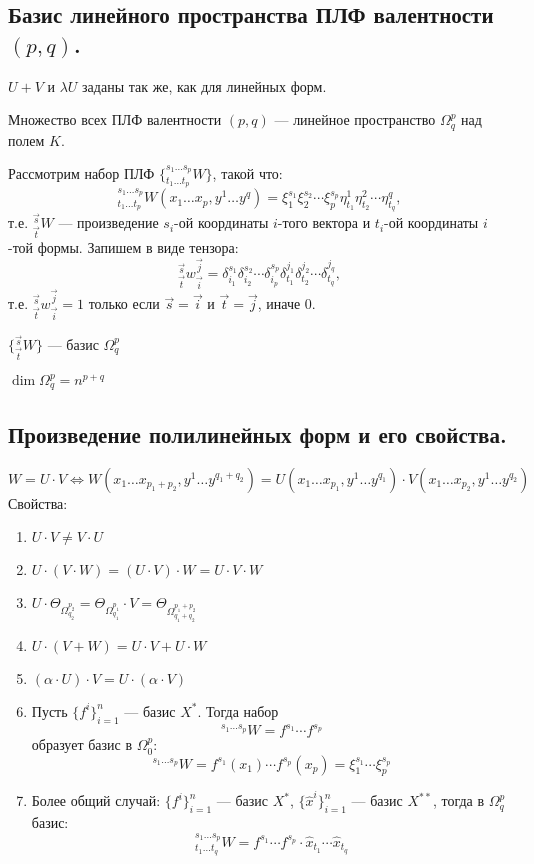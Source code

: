 \subsection{Базис линейного пространства ПЛФ валентности $(p,q)$.}
\begin{definition}
    $U+V$ и $\lambda U$ заданы так же, как для линейных форм.
\end{definition}
\begin{theorem}
    Множество всех ПЛФ валентности $(p, q)$ --- линейное пространство $\Omega^p_q$ над полем $K$.
\end{theorem}
Рассмотрим набор ПЛФ $\{{}^{s_1\ldots s_p}_{t_1\ldots t_p}W\}$, такой что:
$${}^{s_1\ldots s_p}_{t_1\ldots t_p}W(x_1\ldots x_p,y^1\ldots y^q)=\xi_1^{s_1}\xi_2^{s_2}\cdots \xi_p^{s_p}\eta^1_{t_1}\eta^2_{t_2}\cdots \eta^q_{t_q},$$
т.е. ${}^{\vec s}_{\vec t} W$ --- произведение $s_i$-ой координаты $i$-того вектора и $t_i$-ой координаты $i$-той формы. Запишем в виде тензора:
$${}^{\vec s}_{\vec t} w^{\vec j}_{\vec i}=\delta_{i_1}^{s_1}\delta_{i_2}^{s_2}\cdots \delta_{i_p}^{s_p}\delta_{t_1}^{j_1}\delta_{t_2}^{j_2}\cdots\delta_{t_q}^{j_q},$$
т.е. ${}^{\vec s}_{\vec t} w^{\vec j}_{\vec i}=1$ только если $\vec s=\vec i$ и $\vec t=\vec j$, иначе $0$.
\begin{theorem}
    $\{{}^{\vec s}_{\vec t} W\}$ --- базис $\Omega^p_q$
\end{theorem}
$\dim\Omega^p_q=n^{p+q}$
\subsection{Произведение полилинейных форм и его свойства.}
$$W=U\cdot V\Leftrightarrow W(x_1\ldots x_{p_1+p_2}, y^1\ldots y^{q_1+q_2})=U(x_1\ldots x_{p_1}, y^1\ldots y^{q_1})\cdot V(x_1\ldots x_{p_2}, y^1\ldots y^{q_2})$$
Свойства:
\begin{enumerate}
    \item $U\cdot V\not=V\cdot U$
    \item $U\cdot(V\cdot W)=(U\cdot V)\cdot W=U\cdot V\cdot W$
    \item $U\cdot \Theta_{\Omega^{p_2}_{q_2}}=\Theta_{\Omega^{p_1}_{q_1}}\cdot V=\Theta_{\Omega^{p_1+p_2}_{q_1+q_2}}$
    \item $U\cdot(V+W)=U\cdot V+U\cdot W$
    \item $(\alpha\cdot U)\cdot V=U\cdot (\alpha\cdot V)$
    \item Пусть $\{f^i\}_{i=1}^n$ --- базис $X^*$. Тогда набор
    $${}^{s_1\ldots s_p}W=f^{s_1}\cdots f^{s_p}$$
    образует базис в $\Omega^p_0$:
    $${}^{s_1\ldots s_p}W=f^{s_1}(x_1)\cdots f^{s_p}(x_p)=\xi^{s_1}_1\cdots \xi^{s_p}_p$$
    \item Более общий случай: $\{f^i\}_{i=1}^n$ --- базис $X^*$, $\{\hat x^i\}_{i=1}^n$ --- базис $X^{**}$, тогда в $\Omega^p_q$ базис:
    $${}^{s_1\ldots s_p}_{t_1\ldots t_q}W=f^{s_1}\cdots f^{s_p}\cdot \hat x_{t_1}\cdots \hat x_{t_q}$$
\end{enumerate}
